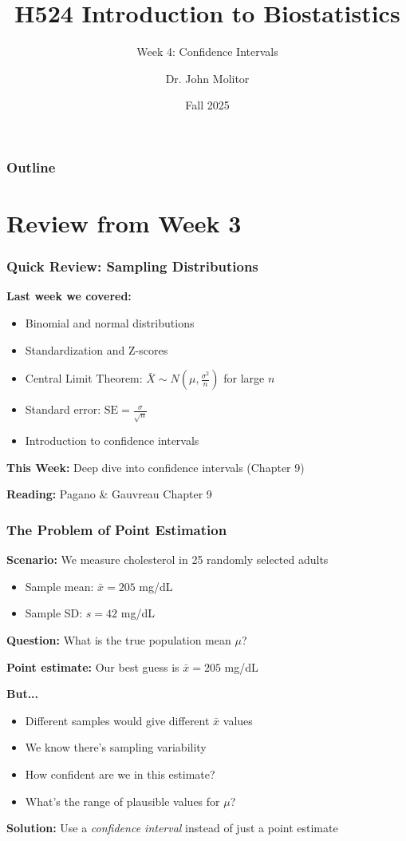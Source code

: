 \documentclass{beamer}
\title{H524 Introduction to Biostatistics}
\subtitle{Week 4: Confidence Intervals}
\author{Dr. John Molitor}
\institute{}
\date{Fall 2025}
\begin{document}
\frame{\titlepage}

\begin{frame}
\frametitle{Outline}
\tableofcontents
\end{frame}

\section{Review from Week 3}

\begin{frame}
\frametitle{Quick Review: Sampling Distributions}
\textbf{Last week we covered:}
\begin{itemize}
\item Binomial and normal distributions
\item Standardization and Z-scores
\item Central Limit Theorem: $\bar{X} \sim N\left(\mu, \frac{\sigma^2}{n}\right)$ for large $n$
\item Standard error: $\text{SE} = \frac{\sigma}{\sqrt{n}}$
\item Introduction to confidence intervals
\end{itemize}

\vspace{0.5cm}
\textbf{This Week:} Deep dive into confidence intervals (Chapter 9)

\vspace{0.3cm}
\textbf{Reading:} Pagano \& Gauvreau Chapter 9
\end{frame}

\begin{frame}
\frametitle{The Problem of Point Estimation}
\textbf{Scenario:} We measure cholesterol in 25 randomly selected adults
\begin{itemize}
\item Sample mean: $\bar{x} = 205$ mg/dL
\item Sample SD: $s = 42$ mg/dL
\end{itemize}

\vspace{0.5cm}
\textbf{Question:} What is the true population mean $\mu$?

\vspace{0.3cm}
\textbf{Point estimate:} Our best guess is $\bar{x} = 205$ mg/dL

\vspace{0.5cm}
\textbf{But...}
\begin{itemize}
\item Different samples would give different $\bar{x}$ values
\item We know there's sampling variability
\item How confident are we in this estimate?
\item What's the range of plausible values for $\mu$?
\end{itemize}

\vspace{0.3cm}
\textbf{Solution:} Use a \textit{confidence interval} instead of just a point estimate
\end{frame}
\end{document}
